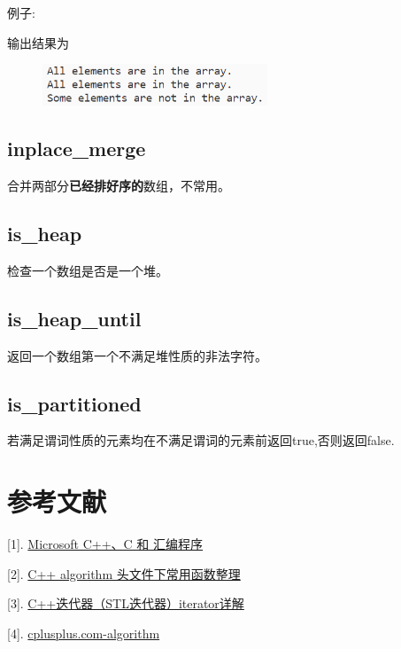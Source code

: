 \documentclass{article}
\begin{document}
    例子:
    

    输出结果为
    \begin{figure}[H]
        \centering
        \includegraphics[width = 0.6\textwidth]{fig10.png}
    \end{figure}

    \subsection{inplace\_merge}
    合并两部分\textbf{已经排好序的}数组，不常用。

    \subsection{is\_heap}
    检查一个数组是否是一个堆。

    \subsection{is\_heap\_until}
    返回一个数组第一个不满足堆性质的非法字符。

    \subsection{is\_partitioned}
    若满足谓词性质的元素均在不满足谓词的元素前返回true,否则返回false.

    

    \section*{参考文献}
    [1]. \href{https://learn.microsoft.com/zh-cn/cpp/cpp/lambda-expressions-in-cpp?view=msvc-170}{Microsoft C++、C 和 汇编程序}
    
    [2]. \href{https://blog.nowcoder.net/n/91357602b82d4377917a35afde085ff8}{C++ algorithm 头文件下常用函数整理}

    [3]. \href{http://c.biancheng.net/view/338.html}{C++迭代器（STL迭代器）iterator详解}

    [4]. \href{https://cplusplus.com/reference/algorithm/}{cplusplus.com-algorithm}
\end{document}

